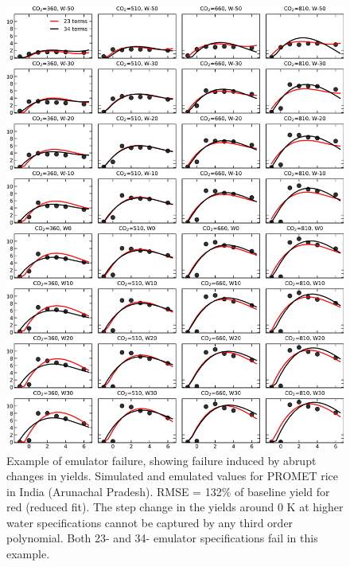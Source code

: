 \documentclass[12pt]{article}
\begin{document}
\begin{figure}[h!]
  \centering
  \includegraphics[width=14cm]{PROMET_rice_bad.png}
  \caption{
	  Example of emulator failure, showing failure induced by abrupt changes in yields. Simulated and emulated values for PROMET rice in India (Arunachal Pradesh). RMSE = 132\% of baseline yield for red (reduced fit).
  The step change in the yields around 0 K at higher water specifications cannot be captured by any third order polynomial. 
  Both 23- and 34- emulator specifications fail in this example.
  }
  \label{fig:lpjmlrice}
\end{figure}
\end{document}
